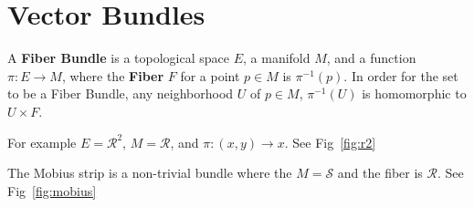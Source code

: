 \chapter{Vector Bundles}

\begin{definition}
A \textbf{Fiber Bundle} is a topological space $E$, a manifold $M$, and a function $\pi : E \rightarrow M$, where the \textbf{Fiber} $F$ for a point $p \in M$ is $\pi^{-1} (p)$. In order for the set to be a Fiber Bundle, any neighborhood $U$ of $p\in M$, $\pi^{-1}(U)$ is homomorphic to $U \times F$.
\end{definition}

\begin{example} \label{ex:r2} For example $E = \mathcal{R}^2$, $M=\mathcal{R}$, and $\pi: (x,y) \rightarrow x$. See Fig~\ref{fig:r2}
\end{example}

\begin{example} The Mobius strip is a non-trivial bundle where the $M=\mathcal{S}$ and the fiber is $\mathcal{R}$.  See Fig~\ref{fig:mobius}
\end{example}

